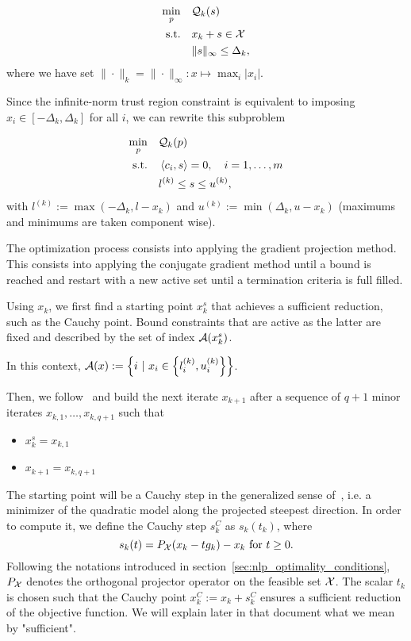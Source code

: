 \documentclass[10pt]{article}
\numberwithin{equation}{section}
\newcommand{\scal}[2]{\left\langle {#1} , {#2} \right\rangle} %
\begin{document}
	 \begin{equation*}
	 	\begin{aligned}
	 		\min_{p} \quad& {\mathcal{Q}}_k(s)  \\
	 		\text{s.t.}  \quad & x_k+s \in {\mathcal{X}} \\ 
	 		& \|s\|_\infty \le \Delta_k,
	 	\end{aligned}	
	 \end{equation*}
	 where we have set $\|\cdot\|_k=\|\cdot\|_\infty:x \mapsto \max_i |x_i|$.
	 
	 Since the infinite-norm trust region constraint is equivalent to imposing $x_i \in [-\Delta_k,\Delta_k]$ for all $i$, we can rewrite this subproblem

	\begin{equation}\label{eq:qsubpb} 
		\begin{aligned}
			\min_{p} \quad& \calQ_k(p)  \\
			\text{s.t.}  \quad &  \scal{c_i}{s} = 0,\quad i=1,\ldots,m \\
			& l^{(k)} \le s \le u^{(k)},
		\end{aligned}	
	\end{equation}
	with $l^{(k)}:= \max(-\Delta_k,l-x_k)$ and $u^{(k)}:= \min(\Delta_k,u-x_k)$ (maximums and minimums are taken component wise).
	
	The optimization process consists into applying the gradient projection method. This consists into applying the conjugate gradient method until a bound is reached and restart with a new active set until a termination criteria is full filled.
	
	Using $x_k$, we first find a starting point $x_k^s$ that achieves a sufficient reduction, such as the Cauchy point. Bound constraints that are active as the latter are fixed and described by the set of index ${\mathcal{A}}(x_k^s)$. 
	
	In this context, ${\mathcal{A}}(x):=\left\{i\ \vert \ x_i \in \left\{l^{(k)}_i,u^{(k)}_i\right\}\right\}$.
	
	Then, we follow~\cite{linmore:1999a} and build the next iterate $x_{k+1}$ after a sequence of $q+1$ minor iterates $x_{k,1},\ldots,x_{k,q+1}$ such that
	\begin{itemize}
		\item $x_{k}^s=x_{k,1}$
		\item $x_{k+1}=x_{k,q+1}$ 
	\end{itemize}
	
	The starting point will be a Cauchy step in the generalized sense of~\cite[][Chapter 12]{conn-etal:2000}, i.e. a minimizer of the quadratic model along the projected steepest direction. In order to compute it, we define the Cauchy step $s^C_k$ as $s_k(t_k)$, where 
	\[s_k(t)=P_{\mathcal{X}}(x_k-tg_k)-x_k \text{ for } t\ge 0.\]
	Following the notations introduced in section~\eqref{sec:nlp_optimality_conditions}, $P_{\mathcal{X}}$ denotes the orthogonal projector operator on the feasible set ${\mathcal{X}}$. The scalar $t_k$ is chosen such that the Cauchy point $x_k^C:= x_k+s^C_k$ ensures a sufficient reduction of the objective function. We will explain later in that document what we mean by "sufficient".
	
\end{document}
